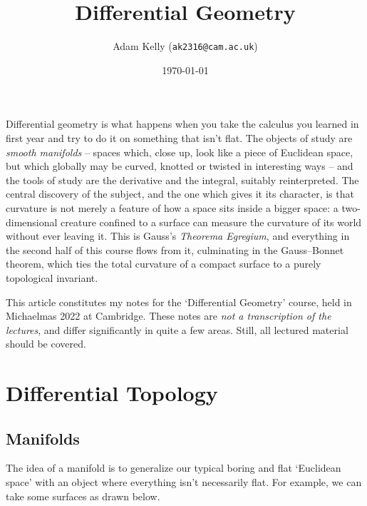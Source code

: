 \documentclass[a4paper]{scrartcl}
\title{Differential Geometry}
\author{Adam Kelly (\texttt{ak2316@cam.ac.uk})}
\date{\today}
\begin{document}
\maketitle

Differential geometry is what happens when you take the calculus you learned in first year and try to do it on something that isn't flat. The objects of study are \emph{smooth manifolds} -- spaces which, close up, look like a piece of Euclidean space, but which globally may be curved, knotted or twisted in interesting ways -- and the tools of study are the derivative and the integral, suitably reinterpreted. The central discovery of the subject, and the one which gives it its character, is that curvature is not merely a feature of how a space sits inside a bigger space: a two-dimensional creature confined to a surface can measure the curvature of its world without ever leaving it. This is Gauss's \emph{Theorema Egregium}, and everything in the second half of this course flows from it, culminating in the Gauss--Bonnet theorem, which ties the total curvature of a compact surface to a purely topological invariant.

This article constitutes my notes for the `Differential Geometry' course, held in Michaelmas 2022 at Cambridge. These notes are \emph{not a transcription of the lectures}, and differ significantly in quite a few areas. Still, all lectured material should be covered.

\tableofcontents

\section{Differential Topology}

\subsection{Manifolds}

The idea of a manifold is to generalize our typical boring and flat `Euclidean space' with an object where everything isn't necessarily flat. For example, we can take some surfaces as drawn below. 
\end{document}
